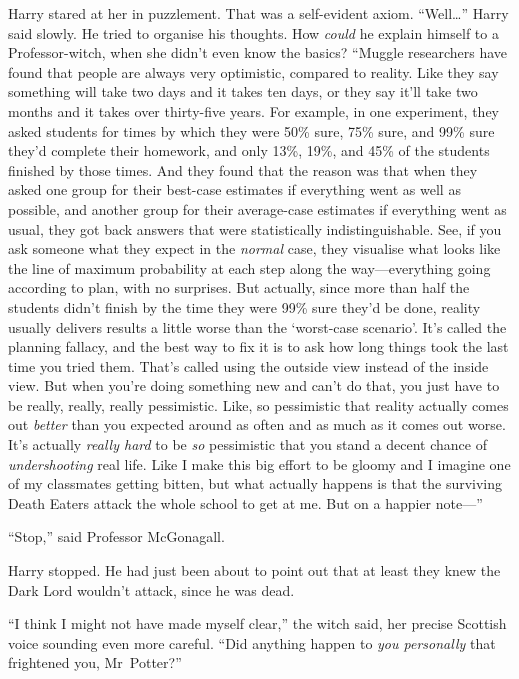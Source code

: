 Harry stared at her in puzzlement. That was a self-evident axiom. “Well…” Harry said slowly. He tried to organise his thoughts. How \emph{could} he explain himself to a Professor-witch, when she didn’t even know the basics? “Muggle researchers have found that people are always very optimistic, compared to reality. Like they say something will take two days and it takes ten days, or they say it’ll take two months and it takes over thirty-five years. For example, in one experiment, they asked students for times by which they were 50\% sure, 75\% sure, and 99\% sure they’d complete their homework, and only 13\%, 19\%, and 45\% of the students finished by those times. And they found that the reason was that when they asked one group for their best-case estimates if everything went as well as possible, and another group for their average-case estimates if everything went as usual, they got back answers that were statistically indistinguishable. See, if you ask someone what they expect in the \emph{normal} case, they visualise what looks like the line of maximum probability at each step along the way—everything going according to plan, with no surprises. But actually, since more than half the students didn’t finish by the time they were 99\% sure they’d be done, reality usually delivers results a little worse than the ‘worst-case scenario’. It’s called the planning fallacy, and the best way to fix it is to ask how long things took the last time you tried them. That’s called using the outside view instead of the inside view. But when you’re doing something new and can’t do that, you just have to be really, really, really pessimistic. Like, so pessimistic that reality actually comes out \emph{better} than you expected around as often and as much as it comes out worse. It’s actually \emph{really hard} to be \emph{so} pessimistic that you stand a decent chance of \emph{undershooting} real life. Like I make this big effort to be gloomy and I imagine one of my classmates getting bitten, but what actually happens is that the surviving Death Eaters attack the whole school to get at me. But on a happier note—”

“Stop,” said Professor McGonagall.

Harry stopped. He had just been about to point out that at least they knew the Dark Lord wouldn’t attack, since he was dead.

“I think I might not have made myself clear,” the witch said, her precise Scottish voice sounding even more careful. “Did anything happen to \emph{you personally} that frightened you, Mr~Potter?”

